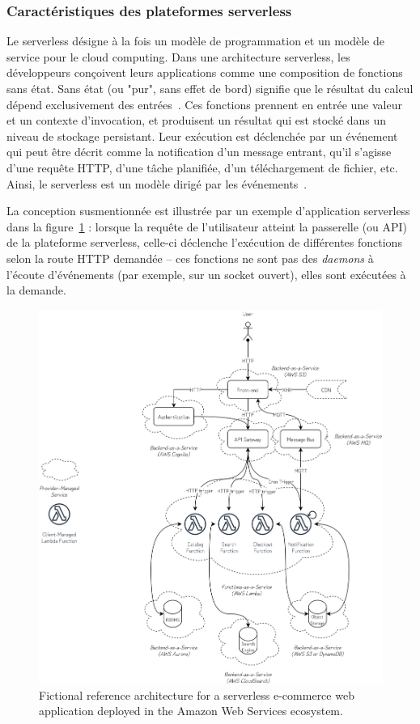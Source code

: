 \subsubsection{Caractéristiques des plateformes serverless}

Le serverless désigne à la fois un modèle de programmation et un modèle de service pour le cloud computing. Dans une architecture serverless, les développeurs conçoivent leurs applications comme une composition de fonctions sans état. Sans état (ou "pur", sans effet de bord) signifie que le résultat du calcul dépend exclusivement des entrées~\cite{burckhardtNetheriteEfficientExecution}. Ces fonctions prennent en entrée une valeur et un contexte d'invocation, et produisent un résultat qui est stocké dans un niveau de stockage persistant. Leur exécution est déclenchée par un événement qui peut être décrit comme la notification d'un message entrant, qu'il s'agisse d'une requête HTTP, d'une tâche planifiée, d'un téléchargement de fichier, etc. Ainsi, le serverless est un modèle dirigé par les événements~\cite{SchleierSmith2021WhatSC}.

La conception susmentionnée est illustrée par un exemple d'application serverless dans la figure~\ref{fig:web-app} : lorsque la requête de l'utilisateur atteint la passerelle (ou API) de la plateforme serverless, celle-ci déclenche l'exécution de différentes fonctions selon la route HTTP demandée -- ces fonctions ne sont pas des \textit{daemons} à l'écoute d'événements (par exemple, sur un socket ouvert), elles sont exécutées à la demande.

\begin{figure}[htbp]
    \centering
	\includegraphics[width=\textwidth]{2_Chapitre2/figures/faas-web-app.png}
	\caption{Fictional reference architecture for a serverless e-commerce web application deployed in the Amazon Web Services ecosystem.}
	\label{fig:web-app}
\end{figure}

